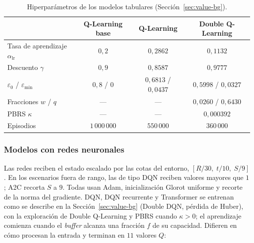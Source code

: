 \documentclass[../00_Main/Main.tex]{subfiles}
\begin{document}
\begin{table}[!htb]
\centering
\caption[Hiperpar\'ametros de los modelos tabulares]{Hiperpar\'ametros
de los modelos tabulares (Secci\'on~\ref{sec:value-bg}).}
\label{tab:tabular-hparams}
\small
\begin{tabular}{@{}lccc@{}}
\toprule
 & \textbf{Q-Learning base} & \textbf{Q-Learning} & \textbf{Double Q-Learning} \\
\midrule
Tasa de aprendizaje $\alpha_{\mathrm{lr}}$ & $0{,}2$ & $0{,}2862$ & $0{,}1132$ \\
Descuento $\gamma$ & $0{,}9$ & $0{,}8587$ & $0{,}9777$ \\
$\varepsilon_0$ / $\varepsilon_{\min}$ & $0{,}8$ / $0$ & $0{,}6813$ / $0{,}0437$ & $0{,}5998$ / $0{,}0327$ \\
Fracciones $w$ / $q$ & --- & --- & $0{,}0260$ / $0{,}6430$ \\
PBRS $\kappa$ & --- & --- & $0{,}000392$ \\
Episodios & $1\,000\,000$ & $550\,000$ & $360\,000$ \\
\bottomrule
\end{tabular}
\end{table}

\subsubsection{Modelos con redes neuronales}\label{sec:deep}

Las redes reciben el estado escalado por las cotas del entorno,
$[R/30,\; t/10,\; S/9]$. En los escenarios fuera de rango, las de tipo
DQN reciben valores mayores que $1$; A2C recorta $S$ a $9$. Todas usan
Adam, inicializaci\'on Glorot uniforme y recorte de la norma del
gradiente. DQN, DQN recurrente y Transformer se entrenan como se
describe en la Secci\'on~\ref{sec:value-bg} (Double DQN, p\'erdida de
Huber), con la exploraci\'on de Double Q-Learning y PBRS cuando
$\kappa > 0$; el aprendizaje comienza cuando el \emph{buffer} alcanza una
fracci\'on $f$ de su capacidad. Difieren en c\'omo procesan la entrada
y terminan en $11$ valores $Q$:
\end{document}
